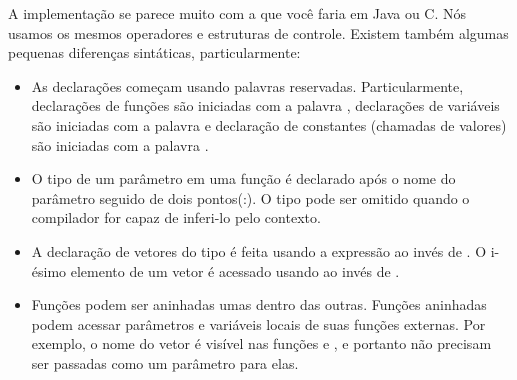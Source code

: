 A implementa\c{c}\~{a}o se parece muito com a que voc\^{e} faria em Java
ou C. N\'{o}s usamos os mesmos operadores e estruturas de controle.
Existem tamb\'{e}m algumas pequenas diferen\c{c}as sint\'{a}ticas, particularmente:
\begin{itemize}
\item
As declara\c{c}\~{o}es come\c{c}am usando palavras reservadas. Particularmente, declara\c{c}\~{o}es de fun\c{c}\~{o}es s\~{a}o iniciadas
com a palavra , declara\c{c}\~{o}es de vari\'{a}veis s\~{a}o iniciadas com a palavra  e
declara\c{c}\~{a}o de constantes (chamadas de valores) s\~{a}o iniciadas com a palavra .
\item
O tipo de um par\^{a}metro em uma fun\c{c}\~{a}o \'{e} declarado ap\'{o}s o nome do par\^{a}metro seguido de dois pontos(:).
O tipo pode ser omitido quando o compilador for capaz de inferi-lo pelo contexto.
\item
A  declara\c{c}\~{a}o de vetores do tipo  \'{e} feita usando a express\~{a}o  ao inv\'{e}s de . 
O i-\'{e}simo elemento de um vetor  \'{e} acessado usando  ao inv\'{e}s de .
\item
Fun\c{c}\~{o}es podem ser aninhadas umas dentro das outras. Fun\c{c}\~{o}es aninhadas podem
acessar par\^{a}metros e vari\'{a}veis locais de suas fun\c{c}\~{o}es externas. Por
exemplo, o nome do vetor  \'{e} vis\'{i}vel nas fun\c{c}\~{o}es  e 
, e portanto n\~{a}o precisam ser passadas como um par\^{a}metro para elas.
\end{itemize}

